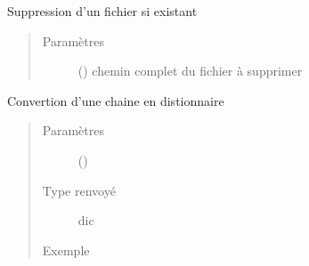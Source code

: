 \documentclass[letterpaper,10pt,french]{sphinxmanual}
\begin{document}

\begin{fulllineitems}
\label{\detokenize{modules/tools:toolbox.tools.remove_file}}
Suppression d’un fichier si existant
\begin{quote}\begin{description}
\item[{Paramètres}] \leavevmode
{} () \textendash{} chemin complet du fichier à supprimer

\end{description}\end{quote}

\end{fulllineitems}


\begin{fulllineitems}
\label{\detokenize{modules/tools:toolbox.tools.str_dic}}
Convertion d’une chaine en distionnaire
\begin{quote}\begin{description}
\item[{Paramètres}] \leavevmode
{} () \textendash{} 

\item[{Type renvoyé}] \leavevmode
dic

\item[{Exemple}] \leavevmode
\begin{sphinxVerbatim}[commandchars=\\\{\}]
  
\end{sphinxVerbatim}

\end{description}\end{quote}

\end{fulllineitems}
\end{document}
